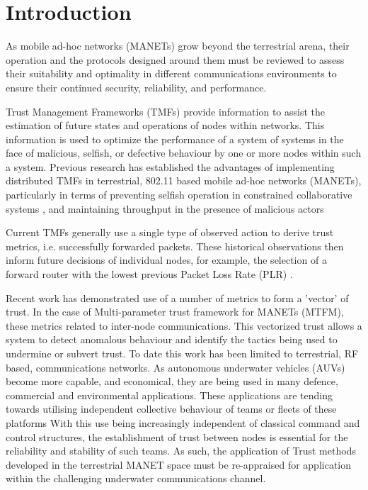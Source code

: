 \documentclass[runningheads,a4paper]{llncs}
\begin{document}
\section{Introduction}\label{sec:introduction}

As mobile ad-hoc networks (MANETs) grow beyond the terrestrial arena, their operation and the protocols designed around them must be reviewed to assess their suitability and optimality in different communications environments to ensure their continued security, reliability, and performance.

Trust Management Frameworks (TMFs) provide information to assist the estimation of future states and operations of nodes within networks.
This information is used to optimize the performance of a system of systems in the face of malicious, selfish, or defective behaviour by one or more nodes within such a system.
Previous research has established the advantages of implementing distributed TMFs in terrestrial, 802.11 based mobile ad-hoc networks (MANETs), particularly in terms of preventing selfish operation in constrained collaborative systems \cite{Li2007}, and maintaining throughput in the presence of malicious actors \cite{Buchegger2002}

Current TMFs generally use a single type of observed action to derive trust metrics, i.e. successfully forwarded packets. These historical observations then inform future decisions of individual nodes, for example, the selection of a forward router with the lowest previous Packet Loss Rate (PLR) \cite{Li2008}.

Recent work has demonstrated use of a number of metrics to form a 'vector’ of trust.
In the case of Multi-parameter trust framework for MANETs (MTFM)\cite{Guo2012}, these metrics related to inter-node communications.
This vectorized trust allows a system to detect anomalous behaviour and identify the tactics being used to undermine or subvert trust.
To date this work has been limited to terrestrial, RF based, communications networks.
As autonomous underwater vehicles (AUVs) become more capable, and economical, they are being used in many defence, commercial and environmental applications.
These applications are tending towards utilising  independent collective behaviour of teams or fleets of these platforms \cite{Caiti2011}
With this use being increasingly independent of classical command and control structures, the establishment of trust between nodes is essential for the reliability and stability of such teams.
As such, the application of Trust methods developed in the terrestrial MANET space must be re-appraised for application within the challenging underwater communications channel.
\end{document}
